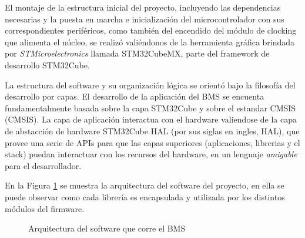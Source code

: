 \documentclass[10pt, a4paper]{report}
\begin{document}
El montaje de la estructura inicial del proyecto, incluyendo las dependencias
necesarias y la puesta en marcha e inicialización del microcontrolador con sus
correspondientes periféricos, como también del encendido del módulo de clocking
que alimenta el núcleo, se realizó vali\'endonos de la herramienta gráfica
brindada por \emph{STMicroelectronics} llamada STM32CubeMX, parte del framework
de desarrollo STM32Cube. 

La estructura del software y su organización lógica se orientó bajo la
filosofía del desarrollo por capas. El desarrollo de la aplicación del
\acrshort{BMS} se encuenta fundamentalmente basada sobre la capa STM32Cube  
y sobre el estandar \acrshort{CMSIS} (\acrlong{CMSIS}).
La capa de aplicación interactua con el hardware valiendose de la capa de
abstacción de hardware STM32Cube \acrshort{HAL} (por sus siglas en ingles,
\acrfull{HAL}), que provee una serie de \acrshort{API}s para que las capas 
superiores (aplicaciones, librerias y el stack) puedan interactuar con los 
recursos del hardware, en un lenguaje \emph{amigable} para el desarrollador.

En la Figura \ref{stack_fw} se muestra la arquitectura del software del
proyecto, en ella  se puede observar como cada librer\'ia es
encapsulada y utilizada por los distintos m\'odulos del firmware.

\begin{figure}[h!]
    \begin{center}
        \caption{Arquitectura del software que corre el \acrshort{BMS}}
        \label{stack_fw}
    \end{center}
\end{figure}
\end{document}
